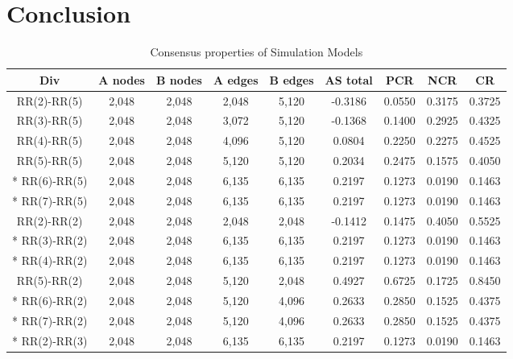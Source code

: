 \section{Conclusion}
\begin{table}[!htb]
	\scriptsize
	\centering
    \caption{Consensus properties of Simulation Models}
	\label{Consensus properties of Simulation Models}
	\begin{center}
		\begin{tabular}{c|c|c|c|c|c|c|c|c} \hline\hline
			Div                    & A nodes& B nodes & A edges & B edges & AS total  & PCR    & NCR    & CR       \\ \hline \hline
			RR(2)-RR(5)            & 2,048  & 2,048   & 2,048   & 5,120   & -0.3186   & 0.0550 & 0.3175 & 0.3725   \\ \hline
			RR(3)-RR(5)            & 2,048  & 2,048   & 3,072   & 5,120   & -0.1368   & 0.1400 & 0.2925 & 0.4325   \\ \hline
			RR(4)-RR(5)            & 2,048  & 2,048   & 4,096   & 5,120   &  0.0804   & 0.2250 & 0.2275 & 0.4525   \\ \hline
			RR(5)-RR(5)            & 2,048  & 2,048   & 5,120   & 5,120   &  0.2034   & 0.2475 & 0.1575 & 0.4050   \\ \hline
		*	RR(6)-RR(5)            & 2,048 	& 2,048   & 6,135   & 6,135   & 0.2197    & 0.1273 & 0.0190 & 0.1463   \\ \hline
		*	RR(7)-RR(5)            & 2,048 	& 2,048   & 6,135   & 6,135   & 0.2197    & 0.1273 & 0.0190 & 0.1463   \\ \hline
			RR(2)-RR(2)            & 2,048  & 2,048   & 2,048   & 2,048   & -0.1412   & 0.1475 & 0.4050 & 0.5525   \\ \hline
		*	RR(3)-RR(2)            & 2,048 	& 2,048   & 6,135   & 6,135   & 0.2197    & 0.1273 & 0.0190 & 0.1463   \\ \hline
		*	RR(4)-RR(2)            & 2,048 	& 2,048   & 6,135   & 6,135   & 0.2197    & 0.1273 & 0.0190 & 0.1463   \\ \hline
			RR(5)-RR(2)            & 2,048 	& 2,048   & 5,120   & 2,048   &  0.4927   & 0.6725 & 0.1725 & 0.8450   \\ \hline
		*	RR(6)-RR(2)            & 2,048  & 2,048   & 5,120   & 4,096   & 0.2633    & 0.2850 & 0.1525 & 0.4375   \\ \hline
		*	RR(7)-RR(2)            & 2,048  & 2,048   & 5,120   & 4,096   & 0.2633    & 0.2850 & 0.1525 & 0.4375   \\ \hline
		*	RR(2)-RR(3)            & 2,048 	& 2,048   & 6,135   & 6,135   & 0.2197    & 0.1273 & 0.0190 & 0.1463   \\ \hline

\end{tabular}
\end{center}
\end{table}
